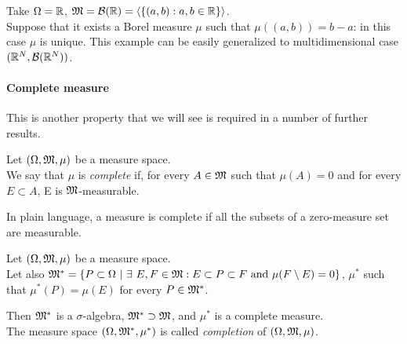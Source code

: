 \begin{exam}
  Take $\Omega = \mathbb R$, $\mathfrak M = \mathcal B(\mathbb R) = \left\langle\{ (a, b) : a, b \in \mathbb R \}\right\rangle$. \\
  Suppose that it exists a Borel measure $\mu$ such that $\mu((a, b)) = b - a$: in this case $\mu$ is unique.
  This example can be easily generalized to multidimensional case $(\mathbb R^N, \mathcal B(\mathbb R^N))$.
\end{exam}

\paragraph{Complete measure} This is another property that we will see is required in a number of further results.
\begin{defn}\label{defn-complete-measure}
  Let $(\Omega, \mathfrak M, \mu)$ be a measure space.\\
  We say that $\mu$ is \emph{complete} if, for every $A \in \mathfrak M$ such that $\mu(A) = 0$ and for every $E \subset A$, E is $\mathfrak M$-measurable.
\end{defn}
In plain language, a measure is complete if all the subsets of a zero-measure set are measurable. 

\begin{theo}
  Let $(\Omega, \mathfrak M, \mu)$ be a measure space. \\
  Let also ${\mm^* 
  	= \{ P \subset \Omega \ 
  	|\ \exists\ E, F \in \mm : 
  	E \subset P \subset F 
  	\text{ and } \mu(F \setminus E) = 0 \}}
  $, $\mu^*$ such that $\mu^*(P) = \mu(E)$ for every $P \in \mathfrak M^*$.

  Then $\mathfrak M^*$ is a $\sigma$-algebra, $\mathfrak M^* \supset \mathfrak M$, and $\mu^*$ is a complete measure. \\
  The measure space $(\Omega, \mathfrak M^*, \mu^*)$ is called \emph{completion} of $(\Omega, \mathfrak M, \mu)$.
\end{theo}

